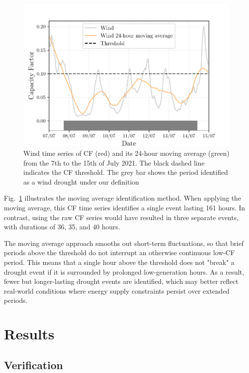 \documentclass[a4paper, 11pt]{article}
\begin{document}
\begin{figure}[ht!]
	\centering
	\includegraphics{droughts_methodology}
	\caption{Wind time series of CF (red) and its 24-hour moving average (green) from the 7th to the 15th of July 2021. The black dashed line indicates the CF threshold. The grey bar shows the period identified as a wind drought under our definition}
	\label{fig:find_res_droughts}
\end{figure}

Fig.~\ref{fig:find_res_droughts} illustrates the moving average identification method. When applying the moving average, this CF time series identifies a single event lasting 161 hours. In contrast, using the raw CF series would have resulted in three separate events, with durations of 36, 35, and 40 hours.

The moving average approach smooths out short-term fluctuations, so that brief periods above the threshold do not interrupt an otherwise continuous low-CF period. This means that a single hour above the threshold does not "break" a drought event if it is surrounded by prolonged low-generation hours. As a result, fewer but longer-lasting drought events are identified, which may better reflect real-world conditions where energy supply constraints persist over extended periods.

\section{Results}
\label{sec:Results}

\subsection{Verification}
\label{sec:verification}
\end{document}
